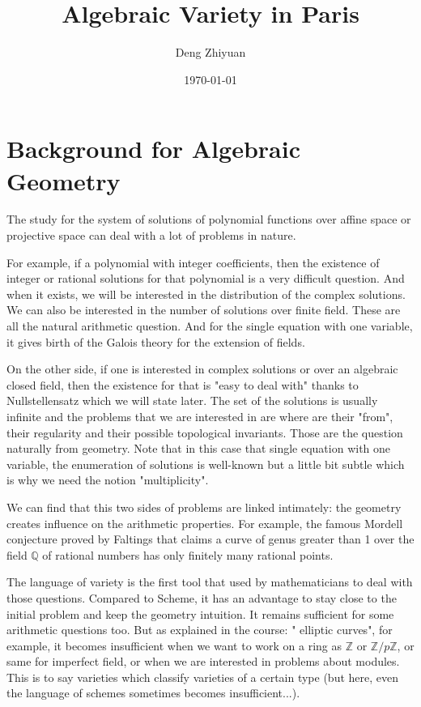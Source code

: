 \documentclass[12pt,a4paper,english]{article}
\title{Algebraic Variety in Paris}
\date{\today}
\author{Deng Zhiyuan}
\theoremstyle{plain}
\theoremstyle{definition}
\theoremstyle{remark}
\begin{document}
\maketitle
\newpage

\tableofcontents
\newpage

\section{Background for Algebraic Geometry}
The study for the system of solutions of polynomial functions over affine space or projective space can deal with a lot of problems in nature.

For example, if a polynomial with integer coefficients, then the existence of integer or rational solutions for that polynomial is a very difficult question. And when it exists, we will be interested in the distribution of the complex solutions. We can also be interested in the number of solutions over finite field. These are all the natural arithmetic question. And for the single equation with one variable, it gives birth of the Galois theory for the extension of fields.

On the other side, if one is interested in complex solutions or over an algebraic closed field, then the existence for that is "easy to deal with" thanks to Nullstellensatz which we will state later. The set of the solutions is usually infinite and the problems that we are interested in are where are their "from", their regularity and their possible topological invariants. Those are the question naturally from geometry. Note that in this case that single equation with one variable, the enumeration of solutions is well-known but a little bit subtle which is why we need the notion "multiplicity". 

We can find that this two sides of problems are linked intimately: the geometry creates influence on the arithmetic properties. For example, the famous Mordell conjecture proved by Faltings that claims a curve of genus greater than 1 over the field $\mathbb{Q}$ of rational numbers has only finitely many rational points.

The language of variety is the first tool that used by mathematicians to deal with those questions. Compared to Scheme, it has an advantage to stay close to the initial problem and keep the geometry intuition. It remains sufficient for some arithmetic questions too. But as explained in the course: " elliptic curves", for example, it becomes insufficient when we want to work on a ring as $\mathbb{Z}$ or $\mathbb{Z}/ p\mathbb{Z}$, or same for imperfect field, or when we are interested in problems about modules. This is to say varieties which classify varieties of a certain
type (but here, even the language of schemes sometimes becomes insufficient...).
\end{document}
